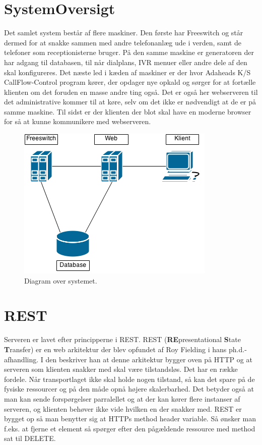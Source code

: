 \pagebreak
\section{SystemOversigt}
Det samlet system består af flere maskiner. Den første har Freeswitch og står dermed for at snakke sammen med andre telefonanlæg ude i verden, samt de telefoner som receptionisterne bruger. På den samme maskine er generatoren der har adgang til databasen, til når dialplans, IVR menuer eller andre dele af den skal konfigureres. Det næste led i kæden af maskiner er der hvor Adaheads K/S CallFlow-Control program kører, der opdager nye opkald og sørger for at fortælle klienten om det foruden en masse andre ting også. Det er også her webserveren til det administrative kommer til at køre, selv om det ikke er nødvendigt at de er på samme maskine. Til sidst er der klienten der blot skal have en moderne browser for så at kunne kommunikere med webserveren.

\begin{figure}[ht!]
\centering
\includegraphics[scale=0.8]{images/systemdiagram.png}
\caption{Diagram over systemet.}
\label{fig:systemdiagram}
\end{figure}


\section{REST}
Serveren er lavet efter principperne i REST.
REST (\textbf{RE}presentational \textbf{S}tate \textbf{T}ransfer) er en web arkitektur der blev opfundet af Roy Fielding i hans ph.d.-afhandling. I den beskriver han at denne arkitektur bygger oven på HTTP og at serveren som klienten snakker med skal være tilstandsløs. Det har en række fordele. Når transportlaget ikke skal holde nogen tilstand, så kan det spare på de fysiske ressourcer og på den måde opnå højere skalerbarhed. Det betyder også at man kan sende forspørgelser parralellet og at der kan kører flere instanser af serveren, og klienten behøver ikke vide hvilken en der snakker med.
REST er bygget op så man benytter sig at HTTPs method header variable. Så ønsker man f.eks. at fjerne et element så spørger efter den pågældende ressource med method sat til DELETE.

















